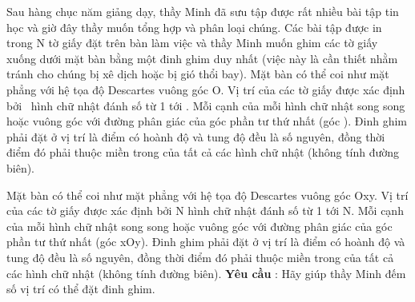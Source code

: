 Sau hàng chục năm giảng dạy, thầy Minh đã sưu tập được rất nhiều bài tập tin học và giờ đây thầy muốn tổng hợp và phân loại chúng. Các bài tập được in trong N tờ giấy đặt trên bàn làm việc và thầy Minh muốn ghim các tờ giấy xuống dưới mặt bàn bằng một đinh ghim duy nhất (việc này là cần thiết nhằm tránh cho chúng bị xê dịch hoặc bị gió thổi bay).       Mặt bàn có thể coi như mặt phẳng với hệ tọa độ Descartes vuông góc Ο. Vị trí của các tờ giấy được xác định bởi  hình chữ nhật đánh số từ 1 tới . Mỗi cạnh của mỗi hình chữ nhật song song hoặc vuông góc với đường phân giác của góc phần tư thứ nhất (góc ). Đinh ghim phải đặt ở vị trí là điểm có hoành độ và tung độ đều là số nguyên, đồng thời điểm đó phải thuộc miền trong của tất cả các hình chữ nhật (không tính đường biên).    

   Mặt bàn có thể coi như mặt phẳng với hệ tọa độ Descartes vuông góc Οxy. Vị trí của các tờ giấy được xác định bởi N hình chữ nhật đánh số từ 1 tới N. Mỗi cạnh của mỗi hình chữ nhật song song hoặc vuông góc với đường phân giác của góc phần tư thứ nhất (góc xOy). Đinh ghim phải đặt ở vị trí là điểm có hoành độ và tung độ đều là số nguyên, đồng thời điểm đó phải thuộc miền trong của tất cả các hình chữ nhật (không tính đường biên).  \textbf{    Yêu cầu   }   : Hãy giúp thầy Minh đếm số vị trí có thể đặt đinh ghim.    

\
